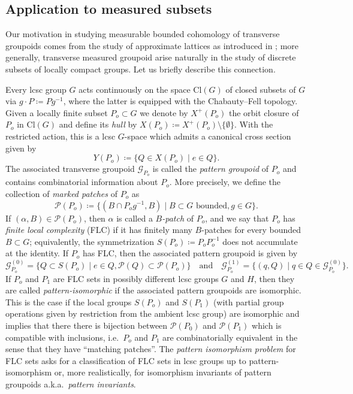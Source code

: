 \documentclass[11pt, oneside]{amsart}
\theoremstyle{definition}
\theoremstyle{remark}
\theoremstyle{TheoremNum}
\newcommand{\cG}{\mathcal{G}}
\newcommand{\qand}{\quad \text{and} \quad}
\newcommand{\cP}{\mathcal P}
\begin{document}
\subsection{Application to measured subsets} 

Our motivation in studying measurable bounded cohomology of transverse groupoids comes from the study of approximate lattices as introduced in \cite{BHApproximateLattices}; more generally, transverse measured groupoid arise naturally in the study of discrete subsets of locally compact groups. Let us briefly describe this connection.

Every lcsc group $G$ acts continuously on the space $\mathrm{Cl}(G)$ of closed subsets of $G$ via $g\cdot P \coloneqq Pg^{-1}$, where the latter is equipped with the Chabauty--Fell topology. Given a locally finite subset $P_o \subset G$ we denote by  $X^+(P_o)$ the orbit closure of $P_o$ in $\mathrm{Cl}(G)$ and define its \emph{hull} by $X(P_o) \coloneqq  X^+(P_o) \setminus \{\emptyset\}$. With the restricted action, this is a lcsc $G$-space which admits a canonical cross section given by
\[
Y(P_o) \coloneqq  \{Q \in X(P_o) \mid e \in Q\}.
\]
The associated transverse groupoid $\cG_{P_o}$ is called the \emph{pattern groupoid} of $P_o$ and contains combinatorial information about $P_o$. More precisely, we define the collection of \emph{marked patches} of $P_o$ as
\[
\mathcal P(P_o) \coloneqq \{(B \cap P_og^{-1}, B) \mid B \subset G \text{ bounded}, g \in G\}.
\]
If $(\alpha, B) \in \mathcal P(P_o)$, then $\alpha$ is called a \emph{$B$-patch} of $P_o$, and we say that $P_o$ has \emph{finite local complexity} (FLC) if it has finitely many $B$-patches for every bounded $B\subset G$; equivalently, the symmetrization $S(P_o) \coloneqq P_oP_o^{-1}$ does not accumulate at the identity. If $P_o$ has FLC, then the associated pattern groupoid is given by
\[
\cG_{P_o}^{(0)} = \{Q \subset S(P_o) \mid e \in Q, \cP(Q) \subset \cP(P_o)\} \qand \cG_{P_o}^{(1)} = \{(q,Q) \mid q \in Q \in \cG_{P_o}^{(0)}\}.
\]
If $P_o$ and $P_1$ are FLC sets in possibly different lcsc groups $G$ and $H$, then they are called \emph{pattern-isomorphic} if the associated pattern groupoids are isomorphic. This is the case if the local groups $S(P_o)$ and $S(P_1)$ (with partial group operations given by restriction from the ambient lcsc group) are isomorphic and implies that there there is bijection between $\cP(P_0)$ and $\cP(P_1)$ which is compatible with inclusions, i.e.\ $P_o$ and $P_1$ are combinatorially equivalent in the sense that they have ``matching patches''. The \emph{pattern isomorphism problem} for FLC sets asks for a classification of FLC sets in lcsc groups up to pattern-isomorphism or, more realistically, for isomorphism invariants of pattern groupoids a.k.a.\ \emph{pattern invariants}.
\end{document}
